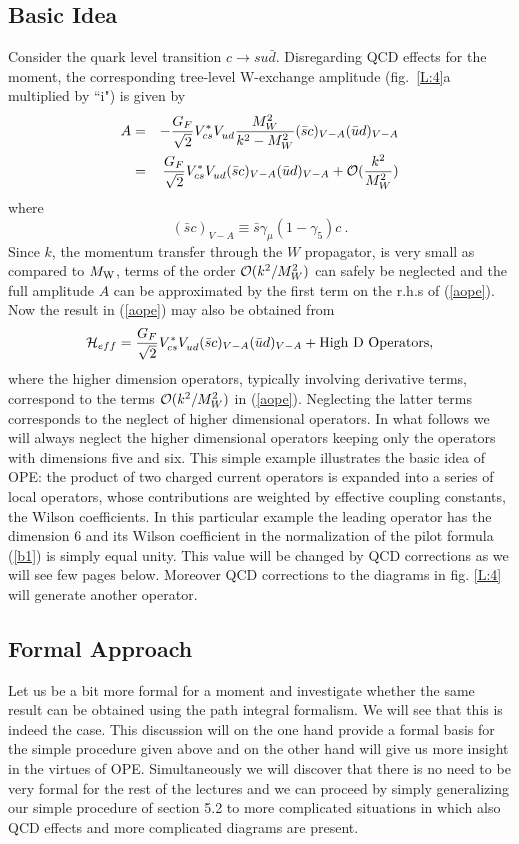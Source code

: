 \documentclass[12pt]{article}
\newcommand{\mw}{M_{\rm W}}
\newcommand{\be}{\begin{equation}}
\newcommand{\ee}{\end{equation}}
\newcommand{\ord}{{\cal O}}
\def\gf{\gamma_5}
\begin{document}
\begin{itemize}
\begin{itemize}
\subsection{Basic Idea}
Consider 
the quark level transition  $c\to su\bar d$.
Disregarding QCD effects for the moment,  the corresponding
tree-level W-exchange
amplitude (fig.~\ref{L:4}a multiplied by ``i") is given by
\begin{eqnarray}\label{aope}
A&=&-{G_F\over\sqrt{2}}V^*_{cs}V_{ud}^{}{M^2_W\over k^2-M^2_W}
  (\bar sc)_{V-A}(\bar ud)_{V-A} \nonumber\\
 &=& {G_F\over\sqrt{2}}V^*_{cs}V_{ud}^{}
  (\bar sc)_{V-A}(\bar ud)_{V-A} + \ord({k^2\over M^2_W})
\end{eqnarray}
where 
\be
(\bar sc)_{V-A}\equiv
\bar s\gamma_{\mu} (1-\gf)c~.
\ee
Since $k$, the momentum transfer through the $W$ propagator, is very
small as compared to $\mw$, terms of the order $\ord({k^2/M^2_W})$
can safely be neglected and the full amplitude $A$ can be approximated
by the first term on the r.h.s of (\ref{aope}).
Now the result in (\ref{aope}) may  also be obtained from 
\begin{equation}\label{hc0}
{\cal H}_{eff}={G_F\over\sqrt{2}}V^*_{cs}V_{ud}^{}
  (\bar sc)_{V-A}(\bar ud)_{V-A} + {\rm High~ D~ Operators},
  \end{equation}
 where the higher dimension operators, typically involving derivative
terms, correspond to the terms $\ord({k^2/M^2_W})$ in (\ref{aope}).
Neglecting the latter terms corresponds to the neglect of higher
dimensional operators. In what follows we will always neglect 
the higher dimensional operators keeping only the operators with
dimensions five
and six.
This
 simple example illustrates the basic idea of  OPE:
the product of two charged current
operators is expanded into a series of local operators,
whose contributions are weighted by effective coupling constants,
the Wilson coefficients. In this particular example the leading
operator has the dimension 6 and its Wilson coefficient in the
normalization of the pilot formula (\ref{b1}) is simply equal
unity. This value will be changed by QCD corrections as we will
see few pages below. Moreover QCD corrections to the diagrams in
fig. \ref{L:4} will generate another operator.

\subsection{Formal Approach}
Let us be a bit more formal for a moment and investigate whether
the same result can be obtained using the path integral formalism.
We will see that this is indeed the case. This discussion will
on the one hand provide a formal basis for the simple procedure
given above and on the other hand will give us more insight
in the virtues of OPE. Simultaneously we will discover that
there is no need to be very formal for the rest of the lectures
and we can proceed by simply generalizing our simple procedure
of section 5.2 to more complicated situations in which also QCD 
effects and more complicated diagrams are
present. 


\end{itemize}
\end{itemize}
\end{document}
